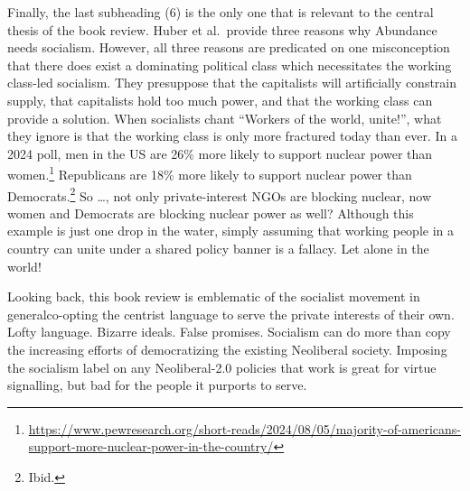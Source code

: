 \documentclass[12pt]{article}
\begin{document}
Finally, the last subheading (6) is the only one that is relevant to the central thesis of the book review. Huber et al.\ provide three reasons why Abundance needs socialism. However, all three reasons are predicated on one misconception\textemdash{} that there does exist a dominating political class which necessitates the working class-led socialism. They presuppose that the capitalists will artificially constrain supply, that capitalists hold too much power, and that the working class can provide a solution. When socialists chant ``Workers of the world, unite!'', what they ignore is that the working class is only more fractured today than ever. In a 2024 poll, men in the US are 26\% more likely to support nuclear power than women.\footnote{\href{https://www.pewresearch.org/short-reads/2024/08/05/majority-of-americans-support-more-nuclear-power-in-the-country/}{https://www.pewresearch.org/short-reads/2024/08/05/majority-of-americans-support-more-nuclear-power-in-the-country/}} Republicans are 18\% more likely to support nuclear power than Democrats.\footnote{Ibid.} So \dots, not only private-interest NGOs are blocking nuclear, now women and Democrats are blocking nuclear power as well? Although this example is just one drop in the water, simply assuming that working people in a country can unite under a shared policy banner is a fallacy. Let alone in the world!

Looking back, this book review is emblematic of the socialist movement in general\textemdash{}co-opting the centrist language to serve the private interests of their own. Lofty language. Bizarre ideals. False promises. Socialism can do more than copy the increasing efforts of democratizing the existing Neoliberal society. Imposing the socialism label on any Neoliberal-2.0 policies that work is great for virtue signalling, but bad for the people it purports to serve.
\end{document}
